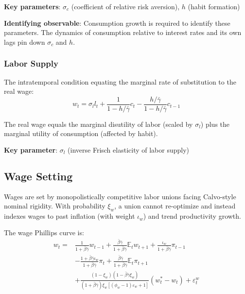 \documentclass[12pt]{article}
\begin{document}
\textbf{Key parameters}: $\sigma_c$ (coefficient of relative risk aversion), $h$ (habit formation)

\textbf{Identifying observable}: Consumption growth is required to identify these parameters. The dynamics of consumption relative to interest rates and its own lags pin down $\sigma_c$ and $h$.

\subsubsection{Labor Supply}

The intratemporal condition equating the marginal rate of substitution to the real wage:
\begin{equation}
\boxed{w_t = \sigma_l l_t + \frac{1}{1-h/\bar{\gamma}}c_t - \frac{h/\bar{\gamma}}{1-h/\bar{\gamma}}c_{t-1}}
\label{eq:laborsupply}
\end{equation}

The real wage equals the marginal disutility of labor (scaled by $\sigma_l$) plus the marginal utility of consumption (affected by habit).

\textbf{Key parameter}: $\sigma_l$ (inverse Frisch elasticity of labor supply)

\subsection{Wage Setting}

Wages are set by monopolistically competitive labor unions facing Calvo-style nominal rigidity. With probability $\xi_w$, a union cannot re-optimize and instead indexes wages to past inflation (with weight $\iota_w$) and trend productivity growth.

The wage Phillips curve is:
\begin{equation}
\boxed{\begin{aligned}
w_t = &\frac{1}{1+\bar{\beta}\bar{\gamma}}w_{t-1} + \frac{\bar{\beta}\bar{\gamma}}{1+\bar{\beta}\bar{\gamma}}\mathbb{E}_t w_{t+1} + \frac{\iota_w}{1+\bar{\beta}\bar{\gamma}}\pi_{t-1} \\
&- \frac{1+\bar{\beta}\bar{\gamma}\iota_w}{1+\bar{\beta}\bar{\gamma}}\pi_t + \frac{\bar{\beta}\bar{\gamma}}{1+\bar{\beta}\bar{\gamma}}\mathbb{E}_t\pi_{t+1} \\
&+ \frac{(1-\xi_w)(1-\bar{\beta}\bar{\gamma}\xi_w)}{(1+\bar{\beta}\bar{\gamma})\xi_w[(\phi_w-1)\varepsilon_w+1]}(w^*_t - w_t) + \varepsilon^w_t
\end{aligned}}
\label{eq:wage}
\end{equation}
\end{document}
